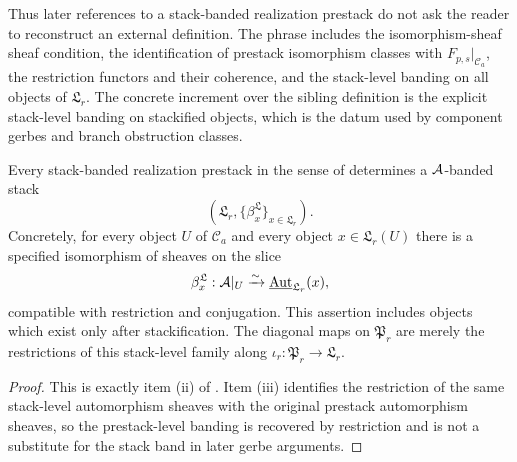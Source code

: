 \begin{remark}
Thus later references to a stack-banded realization prestack do not ask the
reader to reconstruct an external definition. The phrase includes the
isomorphism-sheaf sheaf condition, the identification of prestack isomorphism
classes with $F_{p,s}|_{\mathcal C_a}$, the restriction functors and their
coherence, and the stack-level banding on all objects of $\mathfrak L_r$. The
concrete increment over the sibling definition is the explicit stack-level
banding on stackified objects, which is the datum used by component gerbes and
branch obstruction classes.
\end{remark}

\begin{proposition}\label{prop:realization-stack-already-banded}
Every stack-banded realization prestack in the sense of
 determines a $\mathcal{A}$-banded stack
\[
(\mathfrak L_r,\{\beta^{\mathfrak L}_x\}_{x\in\mathfrak L_r}).
\]
Concretely, for every object $U$ of $\mathcal C_a$ and every object
$x\in\mathfrak L_r(U)$ there is a specified isomorphism of sheaves on the slice
\[
\beta^{\mathfrak L}_x:\mathcal{A}|_U\xrightarrow{\sim}
\underline{\mathrm{Aut}}_{\mathfrak L_r}(x),
\]
compatible with restriction and conjugation. This assertion includes objects
which exist only after stackification. The diagonal maps on $\mathfrak P_r$ are
merely the restrictions of this stack-level family along
$\iota_r:\mathfrak P_r\to\mathfrak L_r$.
\end{proposition}

\begin{proof}
This is exactly item \textup{(ii)} of
. Item \textup{(iii)} identifies the restriction
of the same stack-level automorphism sheaves with the original prestack
automorphism sheaves, so the prestack-level banding is recovered by restriction
and is not a substitute for the stack band in later gerbe arguments.
\end{proof}

